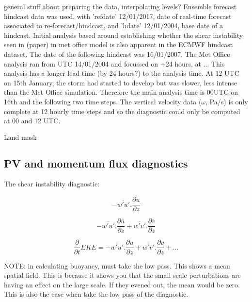 general stuff about preparing the data, interpolating levels?
Ensemble forecast hindcast data was used, with 'refdate' 12/01/2017, date of real-time forecast associated to re-forecast/hindcast, and 'hdate' 12/01/2004, base date of a hindcast. Initial analysis based around establishing whether the shear instability seen in (paper) in met office model is also apparent in the ECMWF hindcast dataset. 
The date of the following hindcast was 16/01/2007. The Met Office analysis ran from UTC 14/01/2004 and focussed on +24 hours, at ...
This analysis has a longer lead time (by 24 hours?) to the analysis time. At 12 UTC on 15th January, the storm had started to develop but was slower, less intense than the Met Office simulation. Therefore the main analysis time is 00UTC on 16th and the following two time steps.
The vertical velocity data ($\omega$, Pa/s) is only complete at 12 hourly time steps and so the diagnostic could only be computed at 00 and 12 UTC.


Land mask

\subsection {PV and momentum flux diagnostics}

The shear instability diagnostic:

\begin{equation} \label{eq_diag}
-\overline{w'u'} . \frac{\overline{\partial u}}{\partial z}
\end{equation}


\begin{equation} \label{eq_diag1}
-\overline{w'u'} . \frac{\partial{\overline u}}{\partial z} + \overline{w'v'} . \frac{\partial{\overline v}}{\partial z}
\end{equation}

\begin{equation} \label{eq_diag2}
\frac{\partial}{\partial{t}} EKE = -\overline{w'u'} . \frac{\partial{\overline u}}{\partial z} + \overline{w'v'} . \frac{\partial{\overline v}}{\partial z} + ...
\end{equation}

NOTE: in calculating buoyancy, must take the low pass. This shows a mean spatial field. This is because it shows you that the small scale perturbations are having an effect on the large scale. If they evened out, the mean would be zero. This is also the case when take the low pass of the diagnostic.

